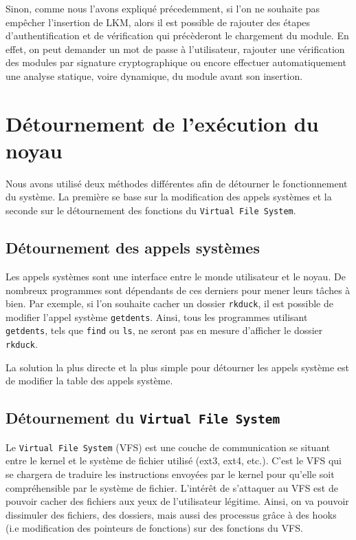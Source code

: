 \documentclass[12pt]{article}
\begin{document}
        Sinon, comme nous l'avons expliqué précedemment, si l'on ne souhaite pas empêcher l'insertion de LKM, alors il est possible de rajouter des étapes d'authentification et de vérification qui précèderont le chargement du module. En effet, on peut demander un mot de passe à l'utilisateur, rajouter une vérification des modules par signature cryptographique ou encore effectuer automatiquement une analyse statique, voire dynamique, du module avant son insertion.
    
\section{Détournement de l'exécution du noyau}  

Nous avons utilisé deux méthodes différentes afin de détourner le fonctionnement du système. La première se base sur la modification des appels systèmes et la seconde sur le détournement des fonctions du \texttt{Virtual File System}.

    \subsection{Détournement des appels systèmes}
    
        Les appels systèmes sont une interface entre le monde utilisateur et le noyau. De nombreux programmes sont dépendants de ces derniers pour mener leurs tâches à bien. Par exemple, si l'on souhaite cacher un dossier \texttt{rkduck}, il est possible de modifier l'appel système \texttt{getdents}. Ainsi, tous les programmes utilisant \texttt{getdents}, tels que \texttt{find} ou \texttt{ls}, ne seront pas en mesure d'afficher le dossier \texttt{rkduck}.

        La solution la plus directe et la plus simple pour détourner les appels système est de modifier la table des appels système\cite{turbochaos}.

    \subsection{Détournement du \texttt{Virtual File System}}
    \label{sec:vfs}
    
        Le \texttt{Virtual File System} (VFS) est une couche de communication se situant entre le kernel et le système de fichier utilisé (ext3, ext4, etc.). C'est le VFS qui se chargera de traduire les instructions envoyées par le kernel pour qu'elle soit compréhensible par le système de fichier.
        L'intérêt de s'attaquer au VFS est de pouvoir cacher des fichiers aux yeux de l'utilisateur légitime. Ainsi, on va pouvoir dissimuler des fichiers, des dossiers, mais aussi des processus grâce à des hooks (i.e modification des pointeurs de fonctions) sur des fonctions du VFS. \\
\end{document}
